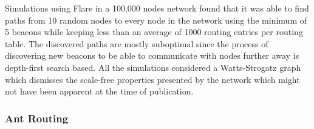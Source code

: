 Simulations using Flare in a 100,000 nodes network found that it was able to find paths from 10 random nodes to every node in the network using the minimum of 5 beacons while keeping less than an average of 1000 routing entries per routing table. The discovered paths are mostly suboptimal since the process of discovering new beacons to be able to communicate with nodes further away is depth-first search based. All the simulations considered a Watts-Strogatz graph \cite{watts-strogatz} which dismisses the scale-free properties presented by the network which might not have been apparent at the time of publication.\\

\subsubsection{Ant Routing}

